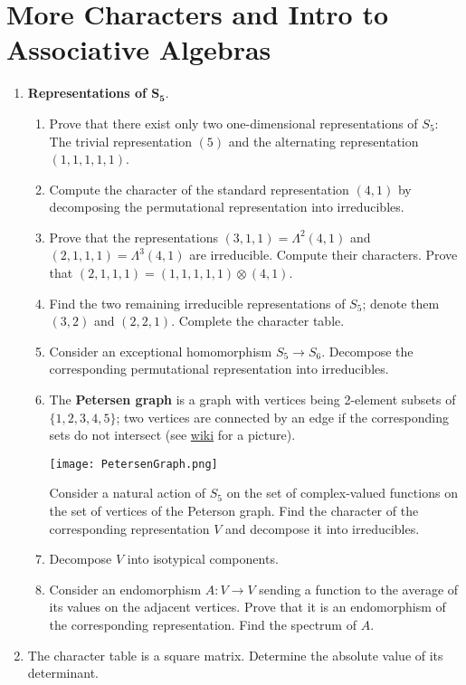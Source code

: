 \documentclass[../psets.tex]{subfiles}
\begin{document}
\section{More Characters and Intro to Associative Algebras}
\begin{enumerate}
    \item {}\textbf{Representations of $\bm{S_5}$}.
    \begin{enumerate}
        \item Prove that there exist only two one-dimensional representations of $S_5$: The trivial representation $(5)$ and the alternating representation $(1,1,1,1,1)$.
        \item Compute the character of the standard representation $(4,1)$ by decomposing the permutational representation into irreducibles.
        \item Prove that the representations $(3,1,1)=\Lambda^2(4,1)$ and $(2,1,1,1)=\Lambda^3(4,1)$ are irreducible. Compute their characters. Prove that $(2,1,1,1)=(1,1,1,1,1)\otimes(4,1)$.
        \item Find the two remaining irreducible representations of $S_5$; denote them $(3,2)$ and $(2,2,1)$. Complete the character table.
        \item Consider an exceptional homomorphism $S_5\to S_6$. Decompose the corresponding permutational representation into irreducibles.
        \item The \textbf{Petersen graph} is a graph with vertices being 2-element subsets of $\{1,2,3,4,5\}$; two vertices are connected by an edge if the corresponding sets do not intersect (see \href{https://en.wikipedia.org/wiki/Petersen_graph}{wiki} for a picture).
        \begin{center}
            \texttt{[image: PetersenGraph.png]}
        \end{center}
        Consider a natural action of $S_5$ on the set of complex-valued functions on the set of vertices of the Peterson graph. Find the character of the corresponding representation $V$ and decompose it into irreducibles.
        \item Decompose $V$ into isotypical components.
        \item Consider an endomorphism $A:V\to V$ sending a function to the average of its values on the adjacent vertices. Prove that it is an endomorphism of the corresponding representation. Find the spectrum of $A$.
    \end{enumerate}
    \item The character table is a square matrix. Determine the absolute value of its determinant.

\end{enumerate}
\end{document}
